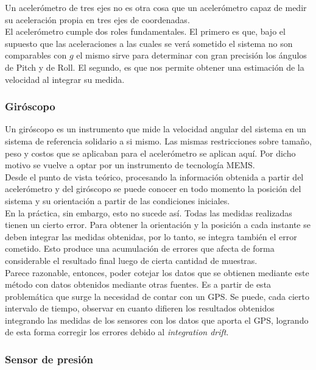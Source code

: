 \documentclass[main]{subfiles}
\begin{document}
Un aceler\'ometro de tres ejes no es otra cosa que un aceler\'ometro capaz de medir su aceleraci\'on propia en tres ejes de coordenadas.\\


El aceler\'ometro cumple dos roles fundamentales. El primero es que, bajo el supuesto que las aceleraciones a las cuales se ver\'a sometido el sistema no son comparables con $g$ el mismo sirve para determinar con gran precisi\'on los \'angulos de Pitch y de Roll. El segundo, es que nos permite obtener una estimaci\'on de la velocidad al integrar su medida.  
 
\subsubsection{Gir\'oscopo}
\label{giro}

Un gir\'oscopo es un instrumento que mide la velocidad angular del sistema en un sistema de referencia solidario a si mismo. Las mismas restricciones sobre tama\~no, peso y costos que se aplicaban para el aceler\'ometro se aplican aqu\'i. Por dicho motivo se vuelve a optar por un instrumento de tecnolog\'ia MEMS.\\ 

Desde el punto de vista te\'orico, procesando la informaci\'on obtenida a partir del aceler\'ometro y del gir\'oscopo se puede conocer en todo momento la posici\'on del sistema y su orientaci\'on a partir de las condiciones iniciales.\\

En la pr\'actica, sin embargo, esto no sucede as\'i. Todas las medidas realizadas tienen un cierto error. Para obtener la orientaci\'on y la posici\'on a cada instante se deben integrar las medidas obtenidas, por lo tanto, se integra tambi\'en el error cometido. Esto produce una acumulaci\'on de errores que afecta de forma considerable el resultado final luego de cierta cantidad de muestras.\\
Parece razonable, entonces, poder cotejar los datos que se obtienen mediante este m\'etodo con datos obtenidos mediante otras fuentes. Es a partir de esta problem\'atica que surge la necesidad de contar con un GPS. Se puede, cada cierto intervalo de tiempo, observar en cuanto difieren los resultados obtenidos integrando las medidas de los sensores con los datos que aporta el GPS, logrando de esta forma corregir los errores debido al \emph{integration drift}.

\subsubsection{Sensor de presi\'on}
\end{document}
